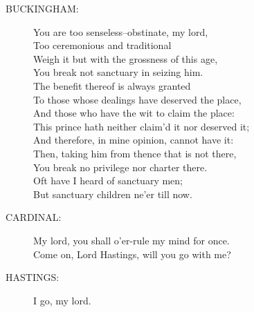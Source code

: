 \documentclass{article}
\begin{document}
\begin{description}
\item[BUCKINGHAM:] 
\hspace{1pt}You are too senseless--obstinate, my lord,\\
\hspace{1pt}Too ceremonious and traditional\\
\hspace{1pt}Weigh it but with the grossness of this age,\\
\hspace{1pt}You break not sanctuary in seizing him.\\
\hspace{1pt}The benefit thereof is always granted\\
\hspace{1pt}To those whose dealings have deserved the place,\\
\hspace{1pt}And those who have the wit to claim the place:\\
\hspace{1pt}This prince hath neither claim'd it nor deserved it;\\
\hspace{1pt}And therefore, in mine opinion, cannot have it:\\
\hspace{1pt}Then, taking him from thence that is not there,\\
\hspace{1pt}You break no privilege nor charter there.\\
\hspace{1pt}Oft have I heard of sanctuary men;\\
\hspace{1pt}But sanctuary children ne'er till now.\\
\end{description}
\begin{description}
\item[CARDINAL:] 
\hspace{1pt}My lord, you shall o'er-rule my mind for once.\\
\hspace{1pt}Come on, Lord Hastings, will you go with me?\\
\end{description}
\begin{description}
\item[HASTINGS:] 
\hspace{1pt}I go, my lord.\\
\end{description}
\end{document}
